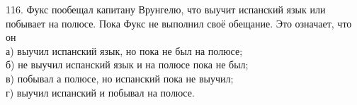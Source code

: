 116. Фукс пообещал капитану Врунгелю, что выучит испанский язык или побывает на полюсе. Пока Фукс не выполнил своё обещание. Это означает, что он\\
а) выучил испанский язык, но пока не был на полюсе;\\
б) не выучил испанский язык и на полюсе пока не был;\\
в) побывал а полюсе, но испанский пока не выучил;\\
г) выучил испанский и побывал на полюсе.\\
